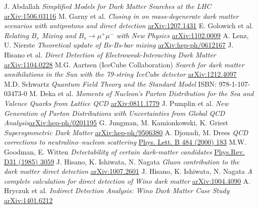 \begin{thebibliography}{xxx}
 J. Abdallah \textit{Simplified Models for Dark Matter Searches at the LHC} \href{https://arxiv.org/abs/1506.03116}{arXiv:1506.03116}
 M. Garny et al. \textit{Closing in on mass-degenerate dark matter scenarios with antiprotons and direct detection} \href{https://arxiv.org/abs/1207.1431}{arXiv:1207.1431}
 E. Golowich et al. \textit{Relating $B_s$ Mixing and $B_s \rightarrow \mu^+ \mu^-$ with New Physics} \href{https://arxiv.org/abs/1102.0009}{arXiv:1102.0009}
 A. Lenz, U. Nierste \textit{Theoretical update of Bs-Bs-bar mixing} \href{https://arxiv.org/abs/hep-ph/0612167}{arXiv:hep-ph/0612167}
  J. Hisano et al. \textit{Direct Detection of Electroweak-Interacting Dark Matter} \href{https://arxiv.org/abs/1104.0228v2}{arXiv:1104.0228}
 M.G. Aartsen (IceCube Collaboration) \textit{Search for dark matter annihilations in the Sun with the 79-string IceCube detector} \href{https://arxiv.org/abs/1212.4097}{arXiv:1212.4097}
 M.D. Schwartz \textit{Quantum Field Theory and the Standard Model} ISBN: 978-1-107-03473-0
 M. Deka et al. \textit{Moments of Nucleon's Parton Distribution for the Sea and Valence Quarks from Lattice QCD} \href{https://arxiv.org/abs/0811.1779}{arXiv:0811.1779}
 J. Pumplin et al. \textit{New Generation of Parton Distributions with Uncertainties from Global QCD Analysis}\href{https://arxiv.org/abs/hep-ph/0201195}{arXiv:hep-ph/0201195}
 G. Jungman, M. Kamionkowski, K. Griest \textit{Supersymmetric Dark Matter} \href{https://arxiv.org/abs/hep-ph/9506380}{arXiv:hep-ph/9506380}
 A. Djouadi, M. Drees \textit{QCD corrections to neutralino–nucleon scattering} \href{http://www.sciencedirect.com/science/journal/03702693/484}{Phys. Lett. B 484 (2000) 183}
 M.W. Goodman, E. Witten \textit{Detectability of certain dark-matter candidates} \href{http://journals.aps.org/prd/abstract/10.1103/PhysRevD.31.3059} {Phys.Rev. D31 (1985) 3059}
 J. Hisano, K. Ishiwata, N. Nagata \textit{Gluon contribution to the dark matter direct detection}  \href{https://arxiv.org/abs/1007.2601}{arXiv:1007.2601}
 J. Hisano, K. Ishiwata, N. Nagata \textit{A complete calculation for direct detection of Wino dark matter}  \href{https://arxiv.org/abs/1004.4090}{arXiv:1004.4090}
 A. Hryczuk et al. \textit{Indirect Detection Analysis: Wino Dark Matter Case Study} \href{https://arxiv.org/abs/1401.6212v2}{arXiv:1401.6212}

\end{thebibliography}
